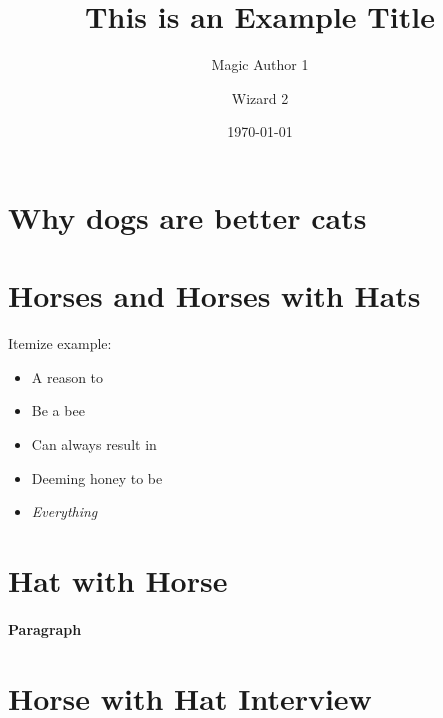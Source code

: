 \documentclass[a3paper, portrait, english, default]{poster}
\title{This is an Example Title}
\author{Magic Author 1\and Wizard 2}
\institute{The Amazing Institute}
\date{\today}
\begin{document}
\maketitle
\section*{Why dogs are better cats}
\lipsum[2]
\vfil
\begin{multicols}{3}
\section*{Horses and Horses with Hats}
   \lipsum[1-3]
   Itemize example:
   \begin{itemize}
      \item A reason to
      \item Be a bee
      \item Can always result in
      \item Deeming honey to be
      \item \textit{Everything}
   \end{itemize}
\section*{Hat with Horse}
   \lipsum[4-6]
   \paragraph{Paragraph}\lipsum[7]
\end{multicols}
\lipsum[2]
\section*{Horse with Hat Interview}
\begin{multicols}{4}
   \lipsum[2]
   \printbibliography
\end{multicols}
\end{document}
